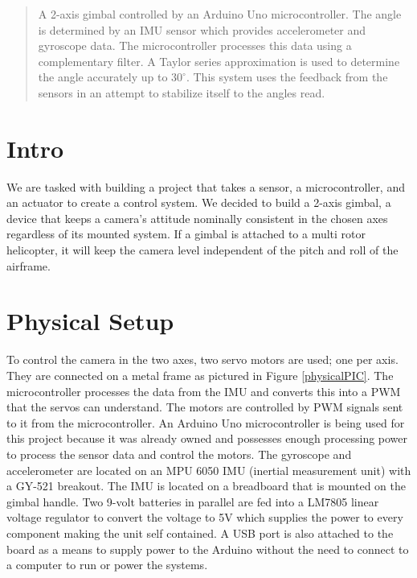 \documentclass{IEEEtran}
\begin{document}

\vfill

\begin{abstract}
A 2-axis gimbal controlled by an Arduino Uno microcontroller. The angle is determined by an IMU sensor which provides accelerometer and gyroscope data. The microcontroller processes this data using a complementary filter. A Taylor series approximation is used to determine the angle accurately up to $30^\circ$. This system uses the feedback from the sensors in an attempt to stabilize itself to the angles read.
\end{abstract}

\section{Intro}
We are tasked with building a project that takes a sensor, a microcontroller, and an actuator to create a control system. We decided to build a 2-axis gimbal, a device that keeps a camera's attitude nominally consistent in the chosen axes regardless of its mounted system. If a gimbal is attached to a multi rotor helicopter, it will keep the camera level independent of the pitch and roll of the airframe.



\section{Physical Setup}

To control the camera in the two axes, two servo motors are used; one per axis. They are connected on a metal frame as pictured in Figure \ref{physicalPIC}. The microcontroller processes the data from the IMU and converts this into a PWM that the servos can understand. The motors are controlled by PWM signals sent to it from the microcontroller. An Arduino Uno microcontroller is being used for this project because it was already owned and possesses enough processing power to process the sensor data and control the motors. The gyroscope and accelerometer are located on an MPU 6050 IMU (inertial measurement unit) with a GY-521 breakout. The IMU is located on a breadboard that is mounted on the gimbal handle. Two 9-volt batteries in parallel are fed into a LM7805 linear voltage regulator to convert the voltage to 5V which supplies the power to every component making the unit self contained. A USB port is also attached to the board as a means to supply power to the Arduino without the need to connect to a computer to run or power the systems.
\end{document}

